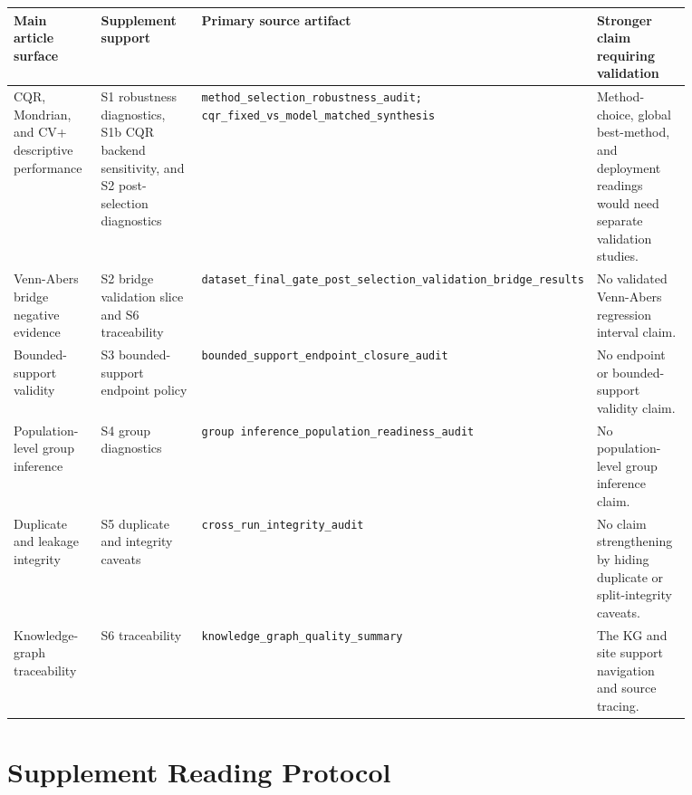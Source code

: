 \documentclass[11pt]{article}
\begin{document}
\begingroup
\footnotesize
\setlength{\tabcolsep}{2pt}
\renewcommand{\arraystretch}{1.18}
\begin{tabular}{@{}>{\RaggedRight\arraybackslash}p{0.180\linewidth}>{\RaggedRight\arraybackslash}p{0.250\linewidth}>{\RaggedRight\arraybackslash}p{0.250\linewidth}>{\RaggedRight\arraybackslash}p{0.190\linewidth}@{}}
\toprule
Main article surface & Supplement support & Primary source artifact & Stronger claim requiring validation \\
\midrule
CQR, Mondrian, and CV+ descriptive performance & S1 robustness diagnostics, S1b CQR backend sensitivity, and S2 post-selection diagnostics & \texttt{method\_\allowbreak{}selection\_\allowbreak{}robustness\_\allowbreak{}audit; cqr\_\allowbreak{}fixed\_\allowbreak{}vs\_\allowbreak{}model\_\allowbreak{}matched\_\allowbreak{}synthesis} & Method-choice, global best-method, and deployment readings would need separate validation studies. \\
Venn-Abers bridge negative evidence & S2 bridge validation slice and S6 traceability & \texttt{dataset\_\allowbreak{}final\_\allowbreak{}gate\_\allowbreak{}post\_\allowbreak{}selection\_\allowbreak{}validation\_\allowbreak{}bridge\_\allowbreak{}results} & No validated Venn-Abers regression interval claim. \\
Bounded-support validity & S3 bounded-support endpoint policy & \texttt{bounded\_\allowbreak{}support\_\allowbreak{}endpoint\_\allowbreak{}closure\_\allowbreak{}audit} & No endpoint or bounded-support validity claim. \\
Population-level group inference & S4 group diagnostics & \texttt{group inference\_\allowbreak{}population\_\allowbreak{}readiness\_\allowbreak{}audit} & No population-level group inference claim. \\
Duplicate and leakage integrity & S5 duplicate and integrity caveats & \texttt{cross\_\allowbreak{}run\_\allowbreak{}integrity\_\allowbreak{}audit} & No claim strengthening by hiding duplicate or split-integrity caveats. \\
Knowledge-graph traceability & S6 traceability & \texttt{knowledge\_\allowbreak{}graph\_\allowbreak{}quality\_\allowbreak{}summary} & The KG and site support navigation and source tracing. \\
\bottomrule
\end{tabular}
\endgroup

\section{Supplement Reading Protocol}
\end{document}
